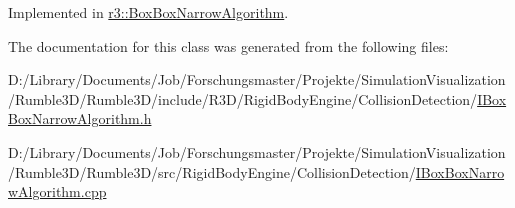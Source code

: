 Implemented in \mbox{\hyperlink{classr3_1_1_box_box_narrow_algorithm_a200098ad4e6e2381f58856002a2d5dec}{r3\+::\+Box\+Box\+Narrow\+Algorithm}}.



The documentation for this class was generated from the following files\+:\begin{DoxyCompactItemize}
\item 
D\+:/\+Library/\+Documents/\+Job/\+Forschungsmaster/\+Projekte/\+Simulation\+Visualization/\+Rumble3\+D/\+Rumble3\+D/include/\+R3\+D/\+Rigid\+Body\+Engine/\+Collision\+Detection/\mbox{\hyperlink{_i_box_box_narrow_algorithm_8h}{I\+Box\+Box\+Narrow\+Algorithm.\+h}}\item 
D\+:/\+Library/\+Documents/\+Job/\+Forschungsmaster/\+Projekte/\+Simulation\+Visualization/\+Rumble3\+D/\+Rumble3\+D/src/\+Rigid\+Body\+Engine/\+Collision\+Detection/\mbox{\hyperlink{_i_box_box_narrow_algorithm_8cpp}{I\+Box\+Box\+Narrow\+Algorithm.\+cpp}}\end{DoxyCompactItemize}
